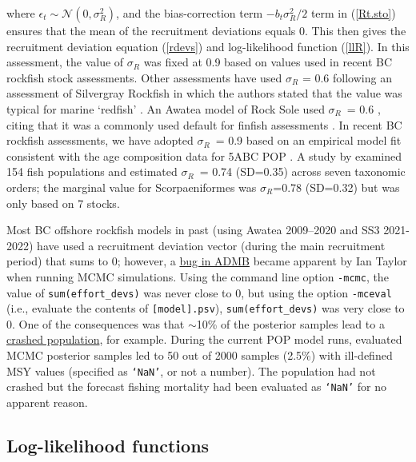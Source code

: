 \documentclass[11pt]{book}
\newcommand{\Norm}{\mathcal{N}}%
\newcommand{\pc}{\%}
\newcommand{\code}[1]{\normalsize\texttt{#1}\normalsize}%
\newcommand{\eref}[1]{(\ref{#1})}
\begin{document}
where $\epsilon_t \sim \Norm(0, \sigma_R^2)$, and the bias-correction term $-b_t \sigma_R^2/2$ term in \eref{Rt.sto} ensures that the mean of the recruitment deviations equals 0. 
This then gives the recruitment deviation equation (\ref{rdevs}) and log-likelihood function (\ref{llR}). 
In this assessment, the value of $\sigma_R$ was fixed at 0.9 based on values used in recent BC rockfish stock assessments.
Other assessments have used $\sigma_R$ = 0.6 following an assessment of Silvergray Rockfish \citep{Starr-etal:2016_sgr} in which the authors stated that the value was typical for marine `redfish' \citep{Mertz-Myers:1996}.
An Awatea model of Rock Sole used $\sigma_R$~= 0.6 \citep{Holt-etal:2016_rol}, citing that it was a commonly used default for finfish assessments \citep{Beddington-Cooke:1983}.
In recent BC rockfish assessments, we have adopted $\sigma_R$~= 0.9 based on an empirical model fit consistent with the age composition data for 5ABC POP \citep{Edwards-etal:2012_pop5ABC}.
A study by \citet{Thorson-etal:2014} examined 154 fish populations and estimated $\sigma_R$~= 0.74 (SD=0.35) across seven taxonomic orders; the marginal value for Scorpaeniformes was $\sigma_R$=0.78 (SD=0.32) but was only based on 7 stocks.

Most BC offshore rockfish models in past (using Awatea 2009--2020 and SS3 2021-2022) have used a recruitment deviation vector (during the main recruitment period) that sums to 0; however, a \href{https://github.com/admb-project/admb/issues/107}{bug in ADMB} became apparent by Ian Taylor when running MCMC simulations. Using the command line option \code{-mcmc}, the value of \code{sum(effort\_devs)} was never close to 0, but using the option \code{-mceval} (i.e., evaluate the contents of \code{[model].psv}), \code{sum(effort\_devs)} was very close to 0.
One of the consequences was that $\sim$10\pc{} of the posterior samples lead to a \href{https://groups.google.com/a/admb-project.org/g/developers/c/8QNAd3a_iGQ}{crashed population}, for example.
During the current POP model runs, evaluated MCMC posterior samples led to 50 out of 2000 samples (2.5\pc{}) with ill-defined MSY values (specified as \code{`NaN'}, or not a number).
The population had not crashed but the forecast fishing mortality had been evaluated as \code{`NaN'} for no apparent reason.

\subsection{Log-likelihood functions}
\end{document}
